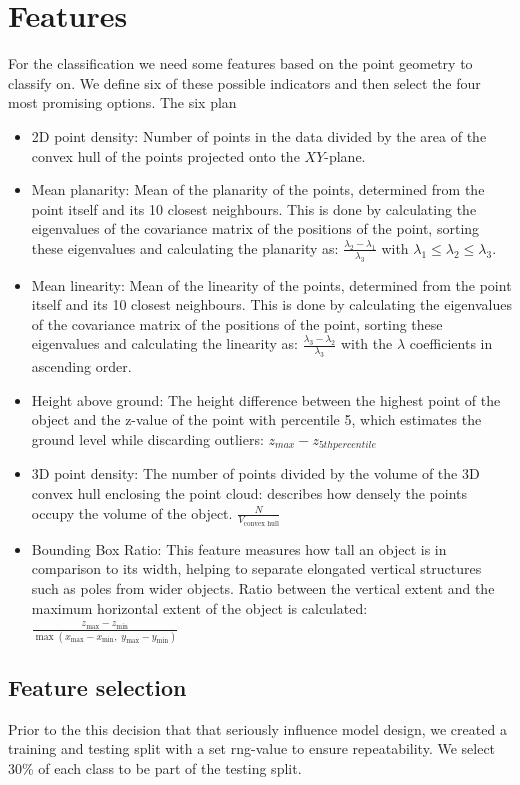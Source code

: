 \documentclass[a4paper,11pt]{scrartcl}
\begin{document}
\section{Features}
For the classification we need some features based on the point geometry to classify on. We define six of these possible indicators and then select the four most promising options. The six plan
\begin{itemize}
    \setlength\itemsep{0pt}
    \item 2D point density: Number of points in the data divided by the area of the convex hull of the points projected onto the $XY$-plane.
    \item Mean planarity: Mean of the planarity of the points, determined from the point itself and its 10 closest neighbours. This is done by calculating the eigenvalues of the covariance matrix of the positions of the point, sorting these eigenvalues and calculating the planarity as: $\frac{\lambda_2 - \lambda_1}{\lambda_3}$ with $\lambda_1 \leq \lambda_2 \leq \lambda_3$.
    \item Mean linearity: Mean of the linearity of the points, determined from the point itself and its 10 closest neighbours. This is done by calculating the eigenvalues of the covariance matrix of the positions of the point, sorting these eigenvalues and calculating the linearity as: $\frac{\lambda_3 - \lambda_2}{\lambda_3}$ with the $\lambda$ coefficients in ascending order.
    \item Height above ground: The height difference between the highest point of the object and the z-value of the point with percentile 5, which estimates the ground level while discarding outliers: $z_{max} - z_{5th percentile}$
    \item 3D point density: The number of points divided by the volume of the 3D convex hull enclosing the point cloud: describes how densely the points occupy the volume of the object. $\frac{N}{V_{\text{convex hull}}}$
    \item Bounding Box Ratio: This feature measures how tall an object is in comparison to its width, helping to separate elongated vertical structures such as poles from wider objects. Ratio between the vertical extent and the maximum horizontal extent of the object is calculated: $\frac{z_{\max} - z_{\min}}{\max(x_{\max} - x_{\min},\; y_{\max} - y_{\min})}$
\end{itemize}
\subsection{Feature selection}
Prior to the this decision that that seriously influence model design, we created a training and testing split with a set rng-value to ensure repeatability. We select 30\% of each class to be part of the testing split.
\end{document}
